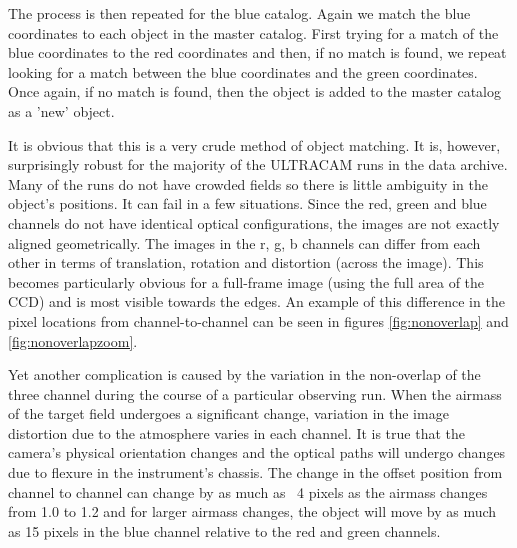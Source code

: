 The process is then repeated for the blue catalog. Again we match the blue coordinates to each object in the master catalog. First trying for a match of the blue coordinates to the red coordinates and then, if no match is found, we repeat looking for a match between the blue coordinates and the green coordinates. Once again, if no match is found, then the object is added to the master catalog as a 'new' object.  

It is obvious that this is a very crude method of object matching. It is, however, surprisingly robust for the majority of the ULTRACAM runs in the data archive. Many of the runs do not have crowded fields so there is little ambiguity in the object's positions. It can fail in a few situations. Since the red, green and blue channels do not have identical optical configurations, the images are not exactly aligned geometrically. The images in the r, g, b channels can differ from each other in terms of translation, rotation and distortion (across the image). This becomes particularly obvious for a full-frame image (using the full area of the CCD) and is most visible towards the edges. An example of this difference in the pixel locations from channel-to-channel can be seen in figures \ref{fig:nonoverlap} and \ref{fig:nonoverlapzoom}.

Yet another complication is caused by the variation in the non-overlap of the three channel during the course of a particular observing run. When the airmass of the target field undergoes a significant change, variation in the image distortion due to the atmosphere varies in each channel. It is true that the camera's physical orientation changes and the optical paths will undergo changes due to flexure in the instrument's chassis. The change in the offset position from channel to channel can change by as much as ~4 pixels as the airmass changes from 1.0 to 1.2 and for larger airmass changes, the object will move by as much as 15 pixels in the blue channel relative to the red and green channels. 

